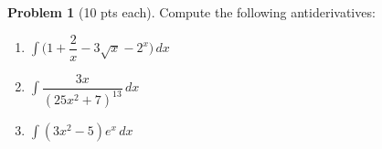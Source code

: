 \documentclass[12pt]{article}
\theoremstyle{definition}
\newtheorem{problem}{Problem}
\begin{document}
\begin{problem}[10 pts each]
Compute the following antiderivatives:
\begin{enumerate}
\item $\displaystyle{\int \big( 1 + \dfrac{2}{x} - 3\sqrt{x} - 2^x \big)\, dx}$
\vspace{2cm}
\item $\displaystyle{\int \dfrac{3x}{(25x^2 + 7)^{13}}\, dx}$
\vspace{4cm}
\item $\displaystyle{\int (3x^2 - 5) e^x\, dx}$
\end{enumerate}
\end{problem}
\end{document}
